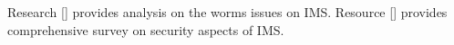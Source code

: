 Research [\cite{mannan2005secure}] provides analysis on the worms issues on IMS\@.
Resource [\cite{mannan2004secure}] provides comprehensive survey on security aspects of IMS\@.